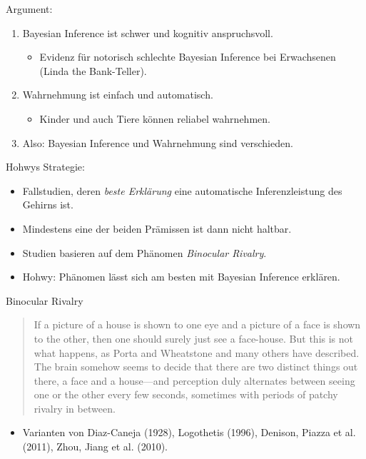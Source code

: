 \documentclass[11pt, handout]{beamer}
\begin{document}
\begin{frame}
  Argument:

  \begin{enumerate}[<+->]
  \item Bayesian Inference ist schwer und kognitiv anspruchsvoll.
    \begin{itemize}[<+->]
    \item Evidenz für notorisch schlechte Bayesian Inference bei
      Erwachsenen (Linda the Bank-Teller).
    \end{itemize}
  \item Wahrnehmung ist einfach und automatisch.
    \begin{itemize}[<+->]
    \item Kinder und auch Tiere können reliabel wahrnehmen.
    
    \end{itemize}
  \item Also: Bayesian Inference und Wahrnehmung sind verschieden.
  \end{enumerate}

\end{frame}

\begin{frame}
  Hohwys Strategie:
  \begin{itemize}[<+->]
  \item Fallstudien, deren \emph{beste Erklärung} eine automatische
    Inferenzleistung des Gehirns ist.
  \item Mindestens eine der beiden Prämissen ist dann nicht haltbar.
  \item Studien basieren auf dem Phänomen \emph{Binocular Rivalry}.
  \item Hohwy: Phänomen lässt sich am besten mit Bayesian Inference
    erklären.
  \end{itemize}
\end{frame}

\begin{frame}
  Binocular Rivalry
  \begin{quote}
    If a picture of a house is shown to one eye and a picture of a
    face is shown to the other, then one should surely just see a
    face-house. But this is not what happens, as Porta and Wheatstone
    and many others have described. The brain somehow seems to decide
    that there are two distinct things out there, a face and a
    house—and perception duly alternates between seeing one or the
    other every few seconds, sometimes with periods of patchy rivalry
    in between.
  \end{quote}
  \begin{itemize}[<+->]
  \item Varianten von Diaz-Caneja (1928), Logothetis (1996), Denison,
    Piazza et al. (2011), Zhou, Jiang et al. (2010).
  \end{itemize}
   
\end{frame}
\end{document}
